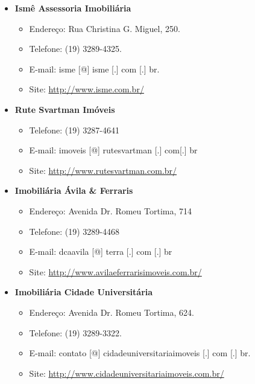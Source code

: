 \begin{itemize}
\item  \textbf{Ismê Assessoria Imobiliária}
\begin{itemize}
\item  Endereço: Rua Christina G. Miguel, 250.
\item  Telefone: (19) 3289-4325.
\item  E-mail: isme [@] isme [.] com [.] br.
\item  Site: \url{http://www.isme.com.br/}
\end{itemize}
\end{itemize}

\begin{itemize}
\item  \textbf{Rute Svartman Imóveis}
\begin{itemize}
\item  Telefone: (19) 3287-4641
\item  E-mail: imoveis [@] rutesvartman [.] com[.] br
\item  Site: \url{http://www.rutesvartman.com.br/}
\end{itemize}
\end{itemize}

\begin{itemize}
\item  \textbf{Imobiliária Ávila \& Ferraris}
\begin{itemize}
\item  Endereço: Avenida Dr. Romeu Tortima, 714
\item  Telefone: (19) 3289-4468
\item  E-mail: dcaavila [@] terra [.] com [.] br
\item  Site: \url{http://www.avilaeferrarisimoveis.com.br/}
\end{itemize}
\end{itemize}

\begin{itemize}
\item  \textbf{Imobiliária Cidade Universitária}
\begin{itemize}
\item  Endereço: Avenida Dr. Romeu Tortima, 624.
\item  Telefone: (19) 3289-3322.
\item  E-mail: contato [@] cidadeuniversitariaimoveis [.] com [.] br.
\item  Site: \url{http://www.cidadeuniversitariaimoveis.com.br/}
\end{itemize}
\end{itemize}

